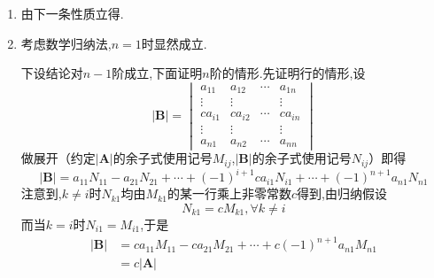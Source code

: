 \begin{formal}
\begin{Proof}
\begin{enumerate}[label = {\textup{(\arabic*)}}]
    然后考虑下三角行列式,设\[
    \left|\bm{A}\right|= \begin{vmatrix}
        a_{11} & 0 & \cdots & 0 \\
        a_{21} & a_{22} & \cdots & 0 \\
        \vdots & \vdots &  & \vdots \\
        a_{n1} & a_{n2} & \cdots & a_{nn}
    \end{vmatrix}
    \]由\cref{def:行列式的递归定义}有\[
    \left|\bm{A}\right|=a_{11}M_{11}-a_{21}M_{21}+\cdots+(-1)^{n+1}a_{n1}M_{n1}
    \]然后考虑$M_{k1}=\left(
        b_{ij}
    \right)_{\left(n-1\right)\times \left(n-1\right)},1\leqslant k\leqslant n$,其中\[
    b_{ij}=
    \begin{cases*}
        a_{i,j+1} &$,1\leqslant i\leqslant k-1;$\\
        a_{i+1,j+1} &$,k\leqslant i\leqslant   n-1.$
    \end{cases*}
    \]
    \vfill
    因为$\left|\bm{A}\right|$是下三角行列式即$a_{ij}=0,\forall i<j$,所以$M_{k1},\forall 1\leqslant k\leqslant n$均是下三角行列式并且断言$k\geqslant 2$时$M_{k1}$必定有零主对角元.事实上,$b_{k-1,k-1}=a_{k-1,k}=0$即得.于是由归纳假设$M_{k1}=0,\forall k\geqslant 2,M_{11}=a_{22}\cdots a_{nn}\Longrightarrow \left|\bm{A}\right|=a_{11}a_{22}\cdots a_{nn}.$于是证毕.
    \item 由下一条性质立得.
    \item 考虑数学归纳法,$n=1$时显然成立.
    
    下设结论对$n-1$阶成立,下面证明$n$阶的情形.先证明行的情形,设
    \[
    \left|\bm{B}\right|=\begin{vmatrix}
       a_{11}&a_{12}&\cdots&a_{1n}\\
         \vdots&\vdots& &\vdots\\
            ca_{i1}&ca_{i2}&\cdots&ca_{in}\\
            \vdots&\vdots& &\vdots\\
            a_{n1}&a_{n2}&\cdots&a_{nn}
    \end{vmatrix}
    \]做展开（约定$\left|\bm{A}\right|$的余子式使用记号$M_{ij}$,$\left|\bm{B}\right|$的余子式使用记号$N_{ij}$）即得\[
    \left|\bm{B}\right|=a_{11}N_{11}-a_{21}N_{21}+\cdots+(-1)^{i+1}ca_{i1}N_{i1}+\cdots+(-1)^{n+1}a_{n1}N_{n1}
    \]注意到,$k\neq i$时$N_{k1}$均由$M_{k1}$的某一行乘上非零常数$c$得到,由归纳假设\[N_{k1}=cM_{k1},\forall k\neq i\]而当$k=i$时$N_{i1}=M_{i1}$,于是\begin{align*}
    \left|\bm{B}\right|&=ca_{11}M_{11}-ca_{21}M_{21}+\cdots+c(-1)^{n+1}a_{n1}M_{n1}\\
    &=c\left|\bm{A}\right|
    \end{align*}


\end{enumerate}
\end{Proof}
\end{formal}
